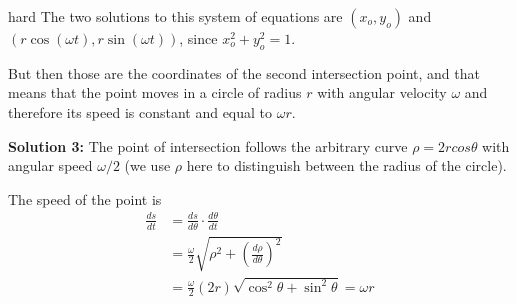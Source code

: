 \begin{solution}{hard}
The two solutions to this system of equations are $(x_o, y_o)$ and $(r\cos ( \omega t), r\sin (\omega t))$, since $x_o^2+y_o^2=1$. \vspace{3mm}

But then those are the coordinates of the second intersection point, and that means that the point moves in a circle of radius $r$ with angular velocity $\omega$ and therefore its speed is constant and equal to $\boxed{\omega r}$.

\tcbline

\textbf{Solution 3:} The point of intersection follows the arbitrary curve $\rho=2rcos\theta$ with angular speed $\omega/2$ (we use $\rho$ here to distinguish between the radius of the circle). \vspace{3mm}

The speed of the point is \begin{align*}
\frac{ds}{dt}&=\frac{ds}{d\theta}\cdot\frac{d\theta}{dt}\\
&=\frac{\omega}{2}\sqrt{\rho^2+\left(\frac{d\rho}{d\theta}\right)^2}\\
&=\frac{\omega}{2}(2r)\sqrt{\cos^2\theta+\sin^2\theta}=\boxed{\omega r}
\end{align*}

\end{solution}